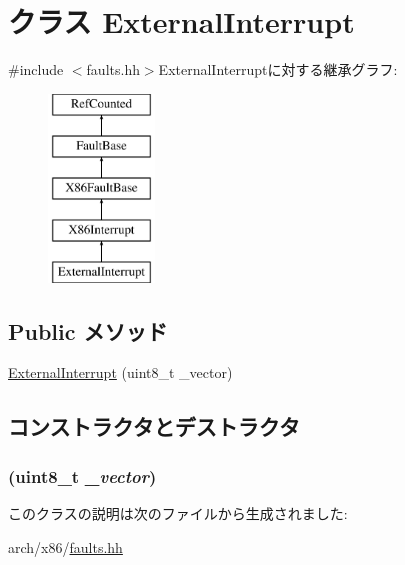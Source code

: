 \hypertarget{classX86ISA_1_1ExternalInterrupt}{
\section{クラス ExternalInterrupt}
\label{classX86ISA_1_1ExternalInterrupt}
}


{\ttfamily \#include $<$faults.hh$>$}ExternalInterruptに対する継承グラフ:\begin{figure}[H]
\begin{center}
\leavevmode
\includegraphics[height=5cm]{classX86ISA_1_1ExternalInterrupt}
\end{center}
\end{figure}
\subsection*{Public メソッド}
\begin{DoxyCompactItemize}
\item 
\hyperlink{classX86ISA_1_1ExternalInterrupt_a9c5e01a36e8b6cc4c4fc81178a34c62d}{ExternalInterrupt} (uint8\_\-t \_\-vector)
\end{DoxyCompactItemize}


\subsection{コンストラクタとデストラクタ}
\hypertarget{classX86ISA_1_1ExternalInterrupt_a9c5e01a36e8b6cc4c4fc81178a34c62d}{
\subsubsection[{ExternalInterrupt}]{ (uint8\_\-t {\em \_\-vector})}}
\label{classX86ISA_1_1ExternalInterrupt_a9c5e01a36e8b6cc4c4fc81178a34c62d}



\begin{DoxyCode}
383                                            :
384             X86Interrupt("External Interrupt", "#INTR", _vector)
385         {}
    };
\end{DoxyCode}


このクラスの説明は次のファイルから生成されました:\begin{DoxyCompactItemize}
\item 
arch/x86/\hyperlink{arch_2x86_2faults_8hh}{faults.hh}\end{DoxyCompactItemize}
